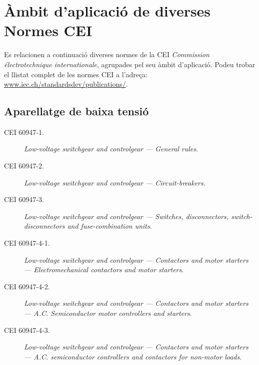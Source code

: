 \section{Àmbit d'aplicació de diverses Normes CEI}\label{sec:normes_IEC}

Es relacionen a continuació diverses normes de la CEI \textit{Commission électrotechnique internationale}, agrupades pel seu àmbit d'aplicació. Podeu trobar el llistat complet de les normes CEI a l'adreça: \href{http://www.iec.ch/standardsdev/publications/}{www.iec.ch/standardsdev/publications/}.

\subsection*{Aparellatge de baixa tensió}
\begin{description}
    \item [\hspace{5mm}CEI 60947-1.] \textit{Low-voltage switchgear and controlgear --- General rules}.
    \item [\hspace{5mm}CEI 60947-2.] \textit{Low-voltage switchgear and controlgear --- Circuit-breakers}.
    \item [\hspace{5mm}CEI 60947-3.] \textit{Low-voltage switchgear and controlgear --- Switches, disconnectors, switch-dis\-con\-nec\-tors and fuse-combination units}.
    \item [\hspace{5mm}CEI 60947-4-1.] \textit{Low-voltage switchgear and controlgear --- Contactors and motor starters --- Electromechanical contactors and motor starters}.
    \item [\hspace{5mm}CEI 60947-4-2.] \textit{Low-voltage switchgear and controlgear --- Contactors and motor starters --- A.C. Semiconductor motor controllers and starters}.
    \item [\hspace{5mm}CEI 60947-4-3.] \textit{Low-voltage switchgear and controlgear --- Contactors and motor starters --- A.C. semiconductor controllers and contactors for non-motor loads}.
\end{description}

